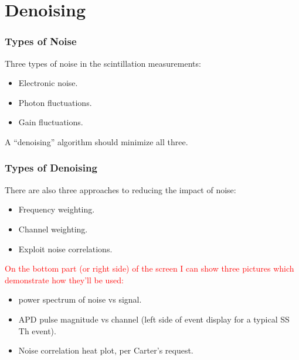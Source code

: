 \documentclass{beamer}
\begin{document}
\section{Denoising}

\begin{frame}
\begin{center}
\frametitle{Types of Noise}
\end{center}
Three types of noise in the scintillation measurements:
\begin{itemize}[leftmargin=*]
\item Electronic noise.\hfill{}
\item Photon fluctuations.\hfill{}
\item Gain fluctuations.\hfill{}
\end{itemize}
A ``denoising'' algorithm should minimize all three.\\[\baselineskip]

\end{frame}

\begin{frame}
\begin{center}
\frametitle{Types of Denoising}
\end{center}
There are also three approaches to reducing the impact of noise:
\begin{itemize}
\item Frequency weighting.
\item Channel weighting.
\item Exploit noise correlations.
\end{itemize}

\textcolor{red}{On the bottom part (or right side) of the screen I can show three pictures which demonstrate how they'll be used:}
\begin{itemize}
\item power spectrum of noise vs signal.
\item APD pulse magnitude vs channel (left side of event display for a typical SS Th event).
\item Noise correlation heat plot, per Carter's request.
\end{itemize}
\end{frame}
\end{document}
